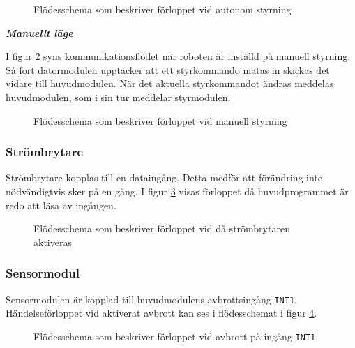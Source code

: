 \documentclass[11pt]{article}
\begin{document}
\begin{flushleft}
\begin{figure}[htbp]
\centering
\noindent\resizebox{0.9\linewidth}{!}{
	}
	\cprotect\caption{Flödesschema som beskriver förloppet vid autonom styrning \label{autonomousMode}}	
\end{figure}

\textbf{\textit{Manuellt läge}}

I figur \ref{manualMode} syns kommunikationsflödet när roboten är inställd på manuell styrning. Så fort datormodulen upptäcker att ett styrkommando matas in skickas det vidare till huvudmodulen. När det aktuella styrkommandot ändras meddelas huvudmodulen, som i sin tur meddelar styrmodulen.

\begin{figure}[htbp]
\centering
\noindent\resizebox{0.7\linewidth}{!}{
	}
	\cprotect\caption{Flödesschema som beskriver förloppet vid manuell styrning \label{manualMode}}	
\end{figure}

\subsubsection {Strömbrytare}
Strömbrytare kopplas till en dataingång. Detta medför att förändring inte nödvändigtvis sker på en gång. I figur \ref{strombrytare} visas förloppet då huvudprogrammet är redo att läsa av ingången. 

\begin{figure}[htbp]
\centering
\noindent\resizebox{.6\linewidth}{!}{
	}
	\cprotect\caption{Flödesschema som beskriver förloppet vid då strömbrytaren aktiveras \label{strombrytare}}	
\end{figure}

\subsubsection {Sensormodul} 
Sensormodulen är kopplad till huvudmodulens avbrottsingång \verb+INT1+. Händelseförloppet vid aktiverat avbrott kan ses i flödesschemat i figur \ref{avbrott_sensormodul}.

\begin{figure}[htbp]
\centering
\noindent\resizebox{1\linewidth}{!}{
	}
	\cprotect\caption{Flödesschema som beskriver förloppet vid avbrott på ingång \verb+INT1+ \label{avbrott_sensormodul}}	
\end{figure}


\end{flushleft}
\end{document}

